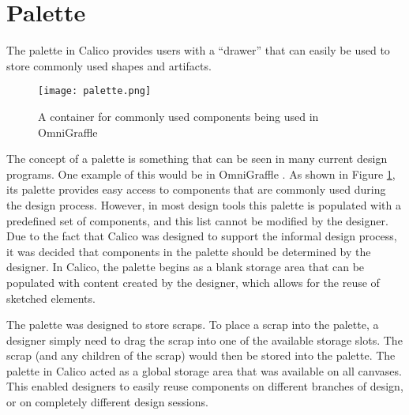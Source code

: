\section{Palette}
The palette in Calico provides users with a ``drawer'' that can easily be used to store commonly used shapes and artifacts.
\begin{figure}[htb]
  \centering
  \texttt{[image: palette.png]}
  \caption{A container for commonly used components being used in OmniGraffle}
  \label{fig:palette_omnigraffle}
\end{figure}
The concept of a palette is something that can be seen in many current design programs. One example of this would be in OmniGraffle \cite{omnigraffle}. As shown in Figure \ref{fig:palette_omnigraffle}, its palette provides easy access to components that are commonly used during the design process. However, in most design tools this palette is populated with a predefined set of components, and this list cannot be modified by the designer. Due to the fact that Calico was designed to support the informal design process, it was decided that components in the palette should be determined by the designer. In Calico, the palette begins as a blank storage area that can be populated with content created by the designer, which allows for the reuse of sketched elements. 

The palette was designed to store scraps. To place a scrap into the palette, a designer simply need to drag the scrap into one of the available storage slots. The scrap (and any children of the scrap) would then be stored into the palette. The palette in Calico acted as a global storage area that was available on all canvases. This enabled designers to easily reuse components on different branches of design, or on completely different design sessions.  
